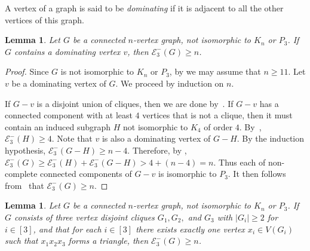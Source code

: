 \documentclass[a4paper,12pt]{article}
\theoremstyle{plain}
\newtheorem{lemma}[thm]{Lemma}
\begin{document}
A vertex of a graph is said to be \emph{dominating} if it is adjacent to all the other vertices of this graph.

\begin{lemma}\label{lem:dominating}
Let $G$ be a connected $n$-vertex graph, not isomorphic to $K_n$ or $P_3$. If $G$ contains a dominating vertex $v$, then $\mathcal{E}_3^{-}(G) \geq n$.
\end{lemma}

\begin{proof}
Since $G$ is not isomorphic to $K_n$ or $P_3$, by  we may assume that $n \geq 11$. Let $v$ be a dominating vertex of $G$. We proceed by induction on $n$.

If $G-v$ is a disjoint union of cliques, then we are done by~. If $G-v$ has a connected component with at least $4$ vertices that is not a clique, then it must contain an induced subgraph $H$ not isomorphic to $K_4$ of order $4$. By~, $\mathcal{E}_{3}^{-}(H)\geq 4$. Note that $v$ is also a dominating vertex of $G-H$. By the induction hypothesis, $\mathcal{E}_{3}^{-}(G-H)\geq n-4$. Therefore, by , $\mathcal{E}_{3}^{-}(G) \geq \mathcal{E}_{3}^{-}(H)+\mathcal{E}_{3}^{-}(G-H) > 4 + (n-4) = n.$ Thus each of non-complete connected components of $G-v$ is isomorphic to $P_3$. It then follows from~ that $\mathcal{E}_3^{-}(G) \geq n$.
\end{proof}


\begin{lemma}\label{lem:ThreeCliques}
Let $G$ be a connected $n$-vertex graph, not isomorphic to $K_n$ or $P_3$. If $G$ consists of three vertex disjoint cliques $G_1, G_2,$ and $G_3$ with $|G_i|\geq 2$ for $i\in [3]$, and that for each $i\in [3]$ there exists exactly one vertex $x_i \in V(G_i)$ such that $x_1x_2x_3$ forms a triangle, then $\mathcal{E}_3^{-}(G) \geq n$.
\end{lemma}
\end{document}
